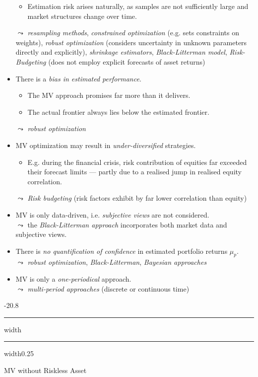 \documentclass[a4paper,landscape,8pt,fleqn]{scrartcl}
\makeatletter
\renewcommand{\subsection}{\@startsection{subsection}{1}{0mm}%
{-2\baselineskip}{0.8\baselineskip}%
{\hrule depth 0.2pt width\columnwidth\hrule depth0.75pt
width0.25\columnwidth\vspace*{1.2em}\large\bfseries}}
\makeatother
\begin{document}
\begin{multicols*}{3}
\begin{itemize}
\begin{itemize}
\item Estimation risk arises naturally, as samples are not sufficiently large and market structures change over time.
\end{itemize}
$\leadsto$ \textit{resampling methods}, \textit{constrained optimization} (e.g. sets constraints on weights), \textit{robust optimization} (considers uncertainty in unknown parameters directly and explicitly), \textit{shrinkage estimators}, \textit{Black-Litterman model}, \textit{Risk-Budgeting} (does not employ explicit forecasts of asset returns)
\item There is a \textit{bias in estimated performance}.
\begin{itemize}
\item The MV approach promises far more than it delivers.
\item The actual frontier always lies below the estimated frontier.
\end{itemize}
$\leadsto$ \textit{robust optimization}
\item MV optimization may result in \textit{under-diversified} strategies.
\begin{itemize}
\item E.g. during the financial crisis, risk contribution of equities far exceeded their forecast limits --- partly due to a realised jump in realised equity correlation.
\end{itemize}
$\leadsto$ \textit{Risk budgeting} (risk factors exhibit by far lower correlation than equity)
\item MV is only data-driven, i.e. \textit{subjective views} are not considered. \\
$\leadsto$ the \textit{Black-Litterman approach} incorporates both market data and subjective views.
\item There is \textit{no quantification of confidence} in estimated portfolio returns $\mu_p$. \\
$\leadsto$ \textit{robust optimization}, \textit{Black-Litterman}, \textit{Bayesian approaches}
\item MV is only a \textit{one-periodical} approach. \\
$\leadsto$ \textit{multi-period approaches} (discrete or continuous time)
\end{itemize}

\subsection{MV without Riskless Asset}


\end{multicols*}
\end{document}
